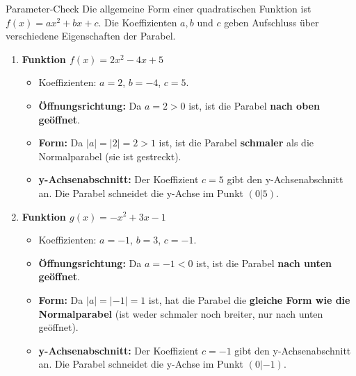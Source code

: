 \begin{loesungsumgebung}{Parameter-Check}
Die allgemeine Form einer quadratischen Funktion ist $f(x) = ax^2 + bx + c$. Die Koeffizienten $a, b$ und $c$ geben Aufschluss über verschiedene Eigenschaften der Parabel.

\begin{enumerate}[label=(\alph*)]
    \item \textbf{Funktion $f(x) = 2x^2 - 4x + 5$}
    \begin{itemize}
        \item Koeffizienten: $a = 2$, $b = -4$, $c = 5$.
        \item \textbf{Öffnungsrichtung:} Da $a = 2 > 0$ ist, ist die Parabel \textbf{nach oben geöffnet}.
        \item \textbf{Form:} Da $|a| = |2| = 2 > 1$ ist, ist die Parabel \textbf{schmaler} als die Normalparabel (sie ist gestreckt).
        \item \textbf{y-Achsenabschnitt:} Der Koeffizient $c = 5$ gibt den y-Achsenabschnitt an. Die Parabel schneidet die y-Achse im Punkt $(0|5)$.
    \end{itemize}

    \item \textbf{Funktion $g(x) = -x^2 + 3x - 1$}
    \begin{itemize}
        \item Koeffizienten: $a = -1$, $b = 3$, $c = -1$.
        \item \textbf{Öffnungsrichtung:} Da $a = -1 < 0$ ist, ist die Parabel \textbf{nach unten geöffnet}.
        \item \textbf{Form:} Da $|a| = |-1| = 1$ ist, hat die Parabel die \textbf{gleiche Form wie die Normalparabel} (ist weder schmaler noch breiter, nur nach unten geöffnet).
        \item \textbf{y-Achsenabschnitt:} Der Koeffizient $c = -1$ gibt den y-Achsenabschnitt an. Die Parabel schneidet die y-Achse im Punkt $(0|-1)$.
    \end{itemize}


\end{enumerate}
\end{loesungsumgebung}
